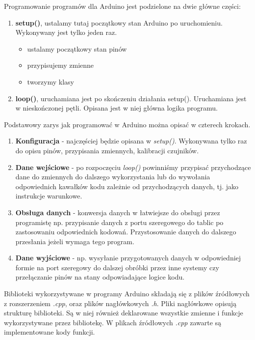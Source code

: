 \documentclass[a4paper,12pt, twoside]{article}
\begin{document}
	\begin{flushleft}
	\vspace{.5cm}Programowanie programów dla Arduino jest podzielone na dwie główne części:
	\begin{enumerate}
	    \item  
	    \textbf{setup()}, ustalamy tutaj początkowy stan Arduino po uruchomieniu. Wykonywany jest tylko jeden raz.	
	    \begin{itemize}
	        \item ustalamy początkowy stan pinów
	        \item przypisujemy zmienne
	        \item tworzymy klasy
    	\end{itemize}
    	\item  
	    \textbf{loop()}, uruchamiana jest po skończeniu działania setup(). Uruchamiana jest w nieskończonej pętli. Opisana jest w niej główna logika programu.
	\end{enumerate}
	
	\flushleft\vspace{.5cm}Podstawowy zarys jak programować w Arduino można opisać w czterech krokach.\cite{stepsarduino} 
	
	
	\begin{enumerate}
	    \item \textbf{Konfiguracja} - najczęściej będzie opisana w \textit{setup()}. Wykonywana tylko raz do opisu pinów, przypisania zmiennych, kalibracji czujników.
	    \item \textbf{Dane wejściowe} - po rozpoczęciu \textit{loop()} powinniśmy przypisać przychodzące dane do zmiennych do dalszego wykorzystania lub do wywołania odpowiednich kawałków kodu zależnie od przychodzących danych, tj. jako instrukcje warunkowe.  
	    \item \textbf{Obsługa danych} - konwersja danych w łatwiejsze do obsługi przez programistę np. przypisanie danych z portu szeregowego do tablic po zastosowaniu odpowiednich kodowań. Przystosowanie danych do dalszego przesłania jeżeli wymaga tego program.
	    \item \textbf{Dane wyjściowe} - np. wysyłanie przygotowanych danych w odpowiedniej formie na port szeregowy do dalszej obróbki przez inne systemy czy przełączanie pinów na stany odpowiadające logice kodu.
	\end{enumerate}
	\end{flushleft}
	
	\vspace{1cm}
    Biblioteki wykorzystywane w programy Arduino składają się z plików źródłowych z rozszerzeniem \textit{.cpp}, oraz plików nagłówkowych \textit{.h}. Pliki nagłówkowe opisują strukturę biblioteki. Są w niej również deklarowane wszystkie zmienne i funkcje wykorzystywane przez bibliotekę. W plikach źródłowych \textit{.cpp} zawarte są implementowane kody funkcji.
    
\end{document}
